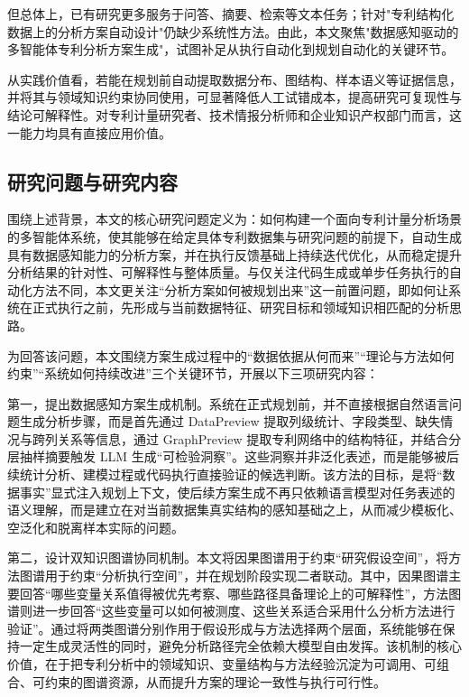 但总体上，已有研究更多服务于问答、摘要、检索等文本任务；针对"专利结构化数据上的分析方案自动设计"仍缺少系统性方法\cite{jiang2025natural}。由此，本文聚焦"数据感知驱动的多智能体专利分析方案生成"，试图补足从执行自动化到规划自动化的关键环节。

从实践价值看，若能在规划前自动提取数据分布、图结构、样本语义等证据信息，并将其与领域知识约束协同使用，可显著降低人工试错成本，提高研究可复现性与结论可解释性。对专利计量研究者、技术情报分析师和企业知识产权部门而言，这一能力均具有直接应用价值。

\subsection{研究问题与研究内容}

围绕上述背景，本文的核心研究问题定义为：如何构建一个面向专利计量分析场景的多智能体系统，使其能够在给定具体专利数据集与研究问题的前提下，自动生成具有数据感知能力的分析方案，并在执行反馈基础上持续迭代优化，从而稳定提升分析结果的针对性、可解释性与整体质量。与仅关注代码生成或单步任务执行的自动化方法不同，本文更关注“分析方案如何被规划出来”这一前置问题，即如何让系统在正式执行之前，先形成与当前数据特征、研究目标和领域知识相匹配的分析思路。

为回答该问题，本文围绕方案生成过程中的“数据依据从何而来”“理论与方法如何约束”“系统如何持续改进”三个关键环节，开展以下三项研究内容：

第一，提出数据感知方案生成机制。系统在正式规划前，并不直接根据自然语言问题生成分析步骤，而是首先通过 DataPreview 提取列级统计、字段类型、缺失情况与跨列关系等信息，通过 GraphPreview 提取专利网络中的结构特征，并结合分层抽样摘要触发 LLM 生成“可检验洞察”。这些洞察并非泛化表述，而是能够被后续统计分析、建模过程或代码执行直接验证的候选判断。该方法的目标，是将“数据事实”显式注入规划上下文，使后续方案生成不再只依赖语言模型对任务表述的语义理解，而是建立在对当前数据集真实结构的感知基础之上，从而减少模板化、空泛化和脱离样本实际的问题。

第二，设计双知识图谱协同机制。本文将因果图谱用于约束“研究假设空间”，将方法图谱用于约束“分析执行空间”，并在规划阶段实现二者联动\cite{pan2024unifying,liu2016knowledge}。其中，因果图谱主要回答“哪些变量关系值得被优先考察、哪些路径具备理论上的可解释性”，方法图谱则进一步回答“这些变量可以如何被测度、这些关系适合采用什么分析方法进行验证”。通过将两类图谱分别作用于假设形成与方法选择两个层面，系统能够在保持一定生成灵活性的同时，避免分析路径完全依赖大模型自由发挥。该机制的核心价值，在于把专利分析中的领域知识、变量结构与方法经验沉淀为可调用、可组合、可约束的图谱资源，从而提升方案的理论一致性与执行可行性。


